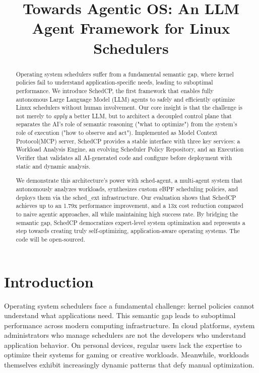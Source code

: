 \documentclass[preprint]{article}
\title{Towards Agentic OS: An LLM Agent Framework for Linux Schedulers}
\newcommand{\sys}{SchedCP\xspace}
\newcommand{\agent}{sched-agent\xspace}
\begin{document}
\maketitle


\begin{abstract}
Operating system schedulers suffer from a fundamental semantic gap, where kernel policies fail to understand application-specific needs, leading to suboptimal performance. We introduce \sys, the first framework that enables fully autonomous Large Language Model (LLM) agents to safely and efficiently optimize Linux schedulers without human involvement. Our core insight is that the challenge is not merely to \emph{apply} a better LLM, but to architect a decoupled control plane that separates the AI's role of semantic reasoning ("what to optimize") from the system's role of execution ("how to observe and act"). Implemented as Model Context Protocol(MCP) server, \sys provides a stable interface with three key services: a Workload Analysis Engine, an evolving Scheduler Policy Repository, and an Execution Verifier that validates all AI-generated code and configure before deployment with static and dynamic analysis. 

We demonstrate this architecture's power with \agent, a multi-agent system that autonomously analyzes workloads, synthesizes custom eBPF scheduling policies, and deploys them via the sched\_ext infrastructure. Our evaluation shows that SchedCP achieves up to an 1.79x performance improvement, and a 13x cost reduction compared to naive agentic approaches, all while maintaining high success rate. By bridging the semantic gap, SchedCP democratizes expert-level system optimization and represents a step towards creating truly self-optimizing, application-aware operating systems. The code will be open-sourced.
\end{abstract}



\maketitle
\section{Introduction}
\label{sec:intro}

Operating system schedulers face a fundamental challenge: kernel policies cannot understand what applications need. This semantic gap leads to suboptimal performance across modern computing infrastructure. In cloud platforms, system administrators who manage schedulers are not the developers who understand application behavior. On personal devices, regular users lack the expertise to optimize their systems for gaming or creative workloads. Meanwhile, workloads themselves exhibit increasingly dynamic patterns that defy manual optimization.
\end{document}
